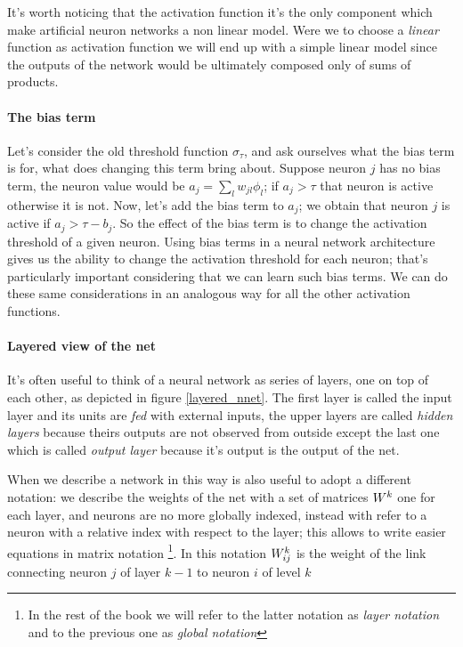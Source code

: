 It's worth noticing that the activation function it's the only component which make artificial neuron networks a non linear model. Were we to choose a \textit{linear} function as activation function we will
end up with a simple linear model since the outputs of the network would be ultimately composed only of sums of products.

\paragraph{The bias term}
Let's consider the old threshold function $\sigma_{\tau}$, and ask ourselves what the bias term is for, what does changing this term bring about.
Suppose neuron $j$ has no bias term, the neuron value would be $a_j = \sum_l w_{jl}\phi_l$; if $a_j>\tau$ that neuron is active otherwise it is not. Now, let's add the bias term to $a_j$;
we obtain that neuron $j$ is active if $a_j>\tau-b_j$. So the effect of the bias term is to change the activation threshold of a given neuron. Using bias terms in a neural network architecture gives us
the ability to change the activation threshold for each neuron; that's particularly important considering that we can learn such bias terms.
We can do these same considerations in an analogous way for all the other activation functions.
\paragraph{Layered view of the net}
It's often useful to think of a neural network as series of layers, one on top of each other, as depicted in figure \ref{layered_nnet}. The first layer is called the input layer and its units are \textit{fed}
with external inputs, the upper layers are called \textit{hidden layers} because theirs outputs are not observed from outside except the last one which is called \textit{output layer} because it's output 
is the output of the net.

When we describe a network in this way is also useful to adopt a different notation: we describe the weights of the net with a set of matrices $W^k$ one for each layer, and neurons are no more
globally indexed, instead with refer to a neuron with a relative index with respect to the layer; this allows to write easier equations in matrix notation
\footnote{In the rest of the book we will refer to the latter notation as \textsl{layer notation} and to the previous one as \textsl{global notation}}.
In this notation $W^k_{ij}$ is the weight of the link connecting neuron $j$ of layer $k-1$ to neuron $i$ of level $k$


